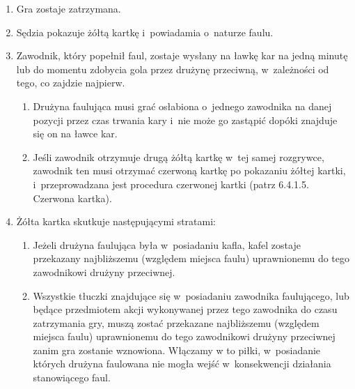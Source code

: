\documentclass[12pt,a4paper]{article}
\begin{document}
\begin{enumerate}
	\item
	      Gra zostaje zatrzymana.
	\item
	      Sędzia pokazuje żółtą kartkę i~powiadamia o~naturze faulu.
	\item
	      Zawodnik, który popełnił faul, zostaje wysłany na ławkę kar na jedną
	      minutę lub do momentu zdobycia gola przez drużynę przeciwną, w~zależności od tego, co zajdzie najpierw.

	      \begin{enumerate}
		      \item
		            Drużyna faulująca musi grać osłabiona o~jednego zawodnika na danej
		            pozycji przez czas trwania kary i~nie może go zastąpić dopóki
		            znajduje się on na ławce kar.
		      \item
		            Jeśli zawodnik otrzymuje drugą żółtą kartkę w~tej samej rozgrywce,
		            zawodnik ten musi otrzymać czerwoną kartkę po pokazaniu żółtej
		            kartki, i~przeprowadzana jest procedura czerwonej kartki (patrz
		            6.4.1.5. Czerwona kartka).
	      \end{enumerate}
	\item
	      Żółta kartka skutkuje następującymi stratami:

	      \begin{enumerate}
		      \item
		            Jeżeli drużyna faulująca była w~posiadaniu kafla, kafel zostaje
		            przekazany najbliższemu (względem miejsca faulu)
		            uprawnionemu do tego zawodnikowi drużyny przeciwnej.
		      \item
				Wszystkie tłuczki znajdujące się w~posiadaniu zawodnika faulującego, lub
				będące przedmiotem akcji wykonywanej przez tego zawodnika do czasu zatrzymania gry, muszą
				zostać przekazane najbliższemu (względem miejsca faulu) uprawnionemu do tego zawodnikowi drużyny przeciwnej zanim gra
				zostanie wznowiona. Włączamy w to piłki, w~posiadanie których
				drużyna faulowana nie mogła wejść w~konsekwencji działania
				stanowiącego faul.


\end{enumerate}
\end{enumerate}
\end{document}
